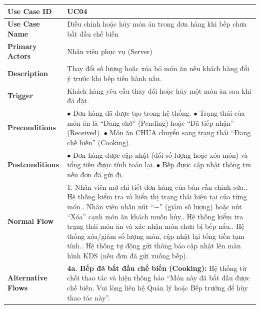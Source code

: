 \documentclass[12pt,a4paper]{article}
\begin{document}
\begin{longtable}{|L{3.5cm}|L{12.5cm}|}
\hline
\textbf{Use Case ID} & UC04 \\ \hline
\textbf{Use Case Name} & Điều chỉnh hoặc hủy món ăn trong đơn hàng khi bếp chưa bắt đầu chế biến \\ \hline
\textbf{Primary Actors} & Nhân viên phục vụ (Server) \\ \hline
\textbf{Description} & Thay đổi số lượng hoặc xóa bỏ món ăn nếu khách hàng đổi ý trước khi bếp tiến hành nấu. \\ \hline
\textbf{Trigger} & Khách hàng yêu cầu thay đổi hoặc hủy một món ăn sau khi đã đặt. \\ \hline
\textbf{Preconditions} &
$\bullet$ Đơn hàng đã được tạo trong hệ thống.\newline
$\bullet$ Trạng thái của món ăn là ``Đang chờ'' (Pending) hoặc ``Đã tiếp nhận'' (Received).\newline
$\bullet$ Món ăn CHƯA chuyển sang trạng thái ``Đang chế biến'' (Cooking). \\ \hline
\textbf{Postconditions} &
$\bullet$ Đơn hàng được cập nhật (đổi số lượng hoặc xóa món) và tổng tiền được tính toán lại.\newline
$\bullet$ Bếp được cập nhật thông tin nếu đơn đã gửi đi. \\ \hline
\textbf{Normal Flow} &
1. Nhân viên mở chi tiết đơn hàng của bàn cần chỉnh sửa.. Hệ thống kiểm tra và hiển thị trạng thái hiện tại của từng món.. Nhân viên nhấn nút ``$-$'' (giảm số lượng) hoặc nút ``Xóa'' cạnh món ăn khách muốn hủy.. Hệ thống kiểm tra trạng thái món ăn và xác nhận món chưa bị bếp nấu.. Hệ thống xóa/giảm số lượng món, cập nhật lại tổng tiền tạm tính.. Hệ thống tự động gửi thông báo cập nhật lên màn hình KDS (nếu đơn đã gửi xuống bếp). \\ \hline
\textbf{Alternative Flows} &
\textbf{4a. Bếp đã bắt đầu chế biến (Cooking):} Hệ thống từ chối thao tác và hiện thông báo ``Món này đã bắt đầu được chế biến. Vui lòng liên hệ Quản lý hoặc Bếp trưởng để hủy thao tác này''. \\ \hline
\end{longtable}
\end{document}
